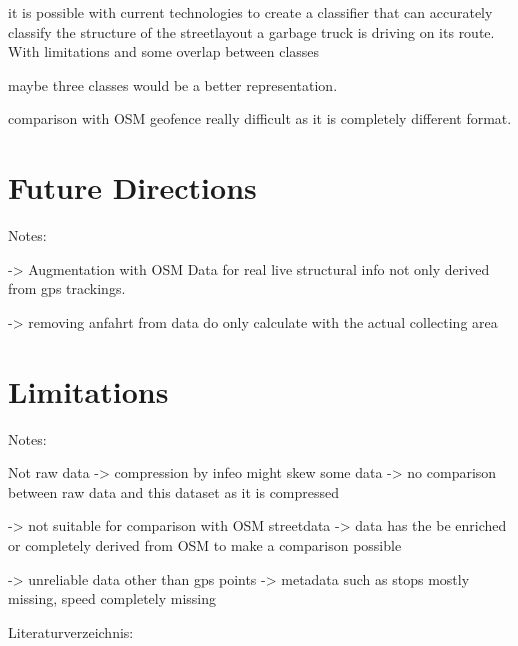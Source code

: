\documentclass[a4paper,12pt,twoside]{scrreprt}
\begin{document}
it is possible with current technologies to create a classifier that can
accurately classify the structure of the streetlayout a garbage truck is
driving on its route.
With limitations and some overlap between classes

maybe three classes would be a better representation.

comparison with OSM geofence really difficult as it is completely different
format.

\section{Future Directions}

Notes:

-> Augmentation with OSM Data for real live structural info not only derived
from gps trackings.

-> removing anfahrt from data do only calculate with the actual collecting area

\section{Limitations}
Notes:

Not raw data -> compression by infeo might skew some data
-> no comparison between raw data and this dataset as it is compressed

-> not suitable for comparison with OSM streetdata
-> data has the be enriched or completely derived from OSM to make a comparison
possible

-> unreliable data other than gps points
-> metadata such as stops mostly missing, speed completely missing

Literaturverzeichnis:
\clearpage
{}
{}
\printbibliography


\end{document}
